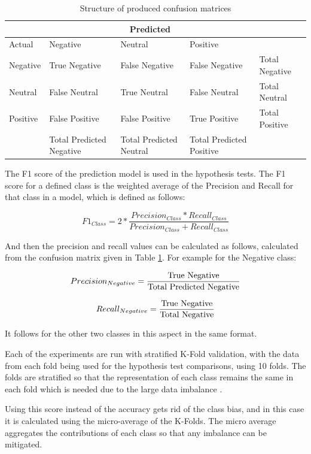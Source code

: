 \begin{table}
\centering
\begin{tabular}{|p{3cm}|p{3cm}|p{3cm}|p{3cm}|p{3cm}|}
 \hline
  & \multicolumn{3}{|c|}{Predicted} & \\
 \hline
   Actual & Negative & Neutral & Positive & \\
    \hline
    Negative &  True Negative   &  False Negative  & False Negative & Total Negative \\
    Neutral & False Neutral & True Neutral&  False Neutral & Total Neutral \\
    Positive & False Positive & False Positive &  True Positive & Total Positive \\
    \hline
    & Total Predicted Negative & Total Predicted Neutral & Total Predicted Positive & \\
 \hline
\end{tabular}
\caption{Structure of produced confusion matrices}
\label{conmat}
\end{table}

The F1 score of the prediction model is used in the hypothesis tests. The F1 score for a defined class is the weighted average of the Precision and Recall for that class in a model, which is defined as follows: 

$$ F1_{Class} = 2 * \frac{Precision_{Class} * Recall_{Class}}{Precision_{Class} + Recall_{Class}} $$

And then the precision and recall values can be calculated as follows, calculated from the confusion matrix given in Table \ref{conmat}.
For example for the Negative class:

$$ Precision_{Negative} = \frac{\textnormal{True Negative}}{\textnormal{Total Predicted Negative}} $$

$$ Recall_{Negative} = \frac{\textnormal{True Negative}}{\textnormal{Total Negative}} $$

It follows for the other two classes in this aspect in the same format.

Each of the experiments are run with stratified K-Fold validation, with the data from each fold being used for the hypothesis test comparisons, using 10 folds. The folds are stratified so that the representation of each class remains the same in each fold which is needed due to the large data imbalance \cite{kohavi1995study}.

Using this score instead of the accuracy gets rid of the class bias, and in this case it is calculated using the micro-average of the K-Folds. The micro average aggregates the contributions of each class so that any imbalance can be mitigated.

